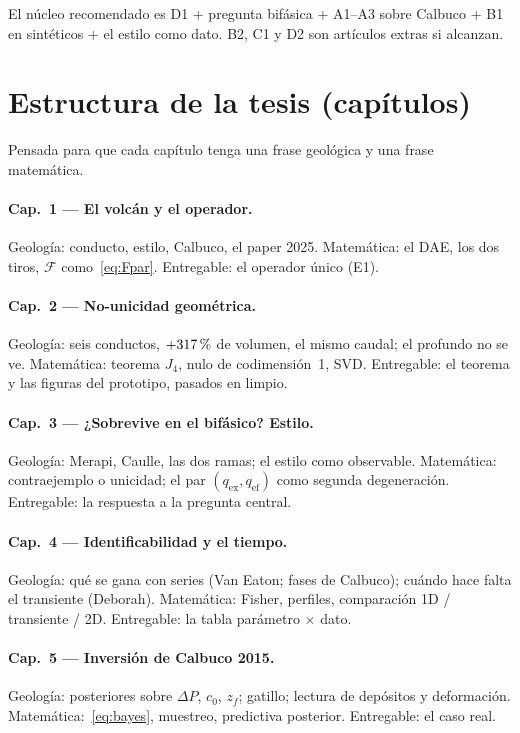 \documentclass[11pt,a4paper]{article}
\theoremstyle{plain}
\theoremstyle{definition}
\theoremstyle{remark}
\newcommand{\pc}{\ifmmode\text{\,\%}\else\,\%\fi}
\newcommand{\F}{\mathcal{F}}
\begin{document}
El núcleo recomendado es D1 + pregunta bifásica + A1--A3 sobre
Calbuco + B1 en sintéticos + el estilo como dato. B2, C1 y D2 son
artículos extras si alcanzan.

\section{Estructura de la tesis (capítulos)}
\label{sec:capitulos}

Pensada para que cada capítulo tenga una frase geológica y una
frase matemática.

\paragraph{Cap.\ 1 --- El volcán y el operador.}
Geología: conducto, estilo, Calbuco, el paper 2025.
Matemática: el DAE, los dos tiros, $\F$ como~\eqref{eq:Fpar}.
Entregable: el operador único (E1).

\paragraph{Cap.\ 2 --- No-unicidad geométrica.}
Geología: seis conductos, $+317\pc$ de volumen, el mismo caudal;
el profundo no se ve.
Matemática: teorema $J_4$, nulo de codimensión~1, SVD.
Entregable: el teorema y las figuras del prototipo, pasados en
limpio.

\paragraph{Cap.\ 3 --- ¿Sobrevive en el bifásico? Estilo.}
Geología: Merapi, Caulle, las dos ramas; el estilo como
observable.
Matemática: contraejemplo o unicidad; el par
$(q_{\mathrm{ex}},q_{\mathrm{ef}})$ como segunda degeneración.
Entregable: la respuesta a la pregunta central.

\paragraph{Cap.\ 4 --- Identificabilidad y el tiempo.}
Geología: qué se gana con series (Van Eaton; fases de Calbuco);
cuándo hace falta el transiente (Deborah).
Matemática: Fisher, perfiles, comparación 1D / transiente / 2D.
Entregable: la tabla parámetro $\times$ dato.

\paragraph{Cap.\ 5 --- Inversión de Calbuco 2015.}
Geología: posteriores sobre $\Delta P$, $c_0$, $z_f$; gatillo;
lectura de depósitos y deformación.
Matemática:~\eqref{eq:bayes}, muestreo, predictiva posterior.
Entregable: el caso real.
\end{document}
